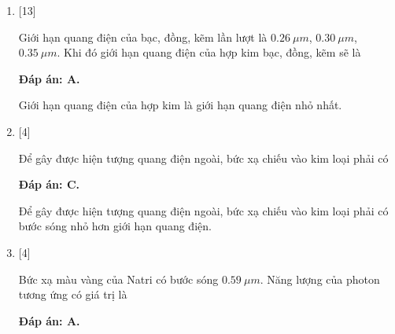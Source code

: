 \begin{enumerate}[label=\bfseries Câu \arabic*:]
{		Năng lượng của các photon ứng với các đơn sắc khác nhau là khác nhau. 
	}
	
	\item {} [13]
	\cauhoi
	{Giới hạn quang điện của bạc, đồng, kẽm lần lượt là $\SI{0,26}{\mu m}$, $\SI{0,30}{\mu m}$, $\SI{0,35}{\mu m}.$ Khi đó giới hạn quang điện của hợp kim bạc, đồng, kẽm sẽ là
	}
	
	\loigiai
	{		\textbf{Đáp án: A.}
		
		Giới hạn quang điện của hợp kim là giới hạn quang điện nhỏ nhất.
	}
	
	\item {} [4]
	\cauhoi
	{Để gây được hiện tượng quang điện ngoài, bức xạ chiếu vào kim loại phải có
	}
	
	\loigiai
	{		\textbf{Đáp án: C.}
		
		Để gây được hiện tượng quang điện ngoài, bức xạ chiếu vào kim loại phải có bước sóng nhỏ hơn giới hạn quang điện. 
	}
	
	\item {} [4]
	\cauhoi
	{Bức xạ màu vàng của Natri có bước sóng $\SI{0,59}{\mu m}$. Năng lượng của photon tương ứng có giá trị là
	}
	
	\loigiai
	{		\textbf{Đáp án: A.}
		
}
\end{enumerate}
